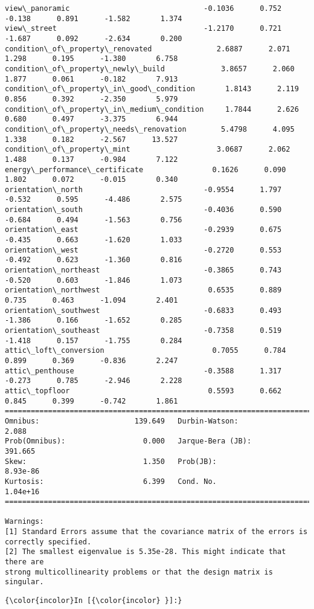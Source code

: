 \documentclass[11pt]{article}
\begin{document}
\begin{Verbatim}[commandchars=\\\{\}]
view\_panoramic                               -0.1036      0.752     -0.138      0.891      -1.582       1.374
view\_street                                  -1.2170      0.721     -1.687      0.092      -2.634       0.200
condition\_of\_property\_renovated               2.6887      2.071      1.298      0.195      -1.380       6.758
condition\_of\_property\_newly\_build             3.8657      2.060      1.877      0.061      -0.182       7.913
condition\_of\_property\_in\_good\_condition       1.8143      2.119      0.856      0.392      -2.350       5.979
condition\_of\_property\_in\_medium\_condition     1.7844      2.626      0.680      0.497      -3.375       6.944
condition\_of\_property\_needs\_renovation        5.4798      4.095      1.338      0.182      -2.567      13.527
condition\_of\_property\_mint                    3.0687      2.062      1.488      0.137      -0.984       7.122
energy\_performance\_certificate                0.1626      0.090      1.802      0.072      -0.015       0.340
orientation\_north                            -0.9554      1.797     -0.532      0.595      -4.486       2.575
orientation\_south                            -0.4036      0.590     -0.684      0.494      -1.563       0.756
orientation\_east                             -0.2939      0.675     -0.435      0.663      -1.620       1.033
orientation\_west                             -0.2720      0.553     -0.492      0.623      -1.360       0.816
orientation\_northeast                        -0.3865      0.743     -0.520      0.603      -1.846       1.073
orientation\_northwest                         0.6535      0.889      0.735      0.463      -1.094       2.401
orientation\_southwest                        -0.6833      0.493     -1.386      0.166      -1.652       0.285
orientation\_southeast                        -0.7358      0.519     -1.418      0.157      -1.755       0.284
attic\_loft\_conversion                         0.7055      0.784      0.899      0.369      -0.836       2.247
attic\_penthouse                              -0.3588      1.317     -0.273      0.785      -2.946       2.228
attic\_topfloor                                0.5593      0.662      0.845      0.399      -0.742       1.861
==============================================================================
Omnibus:                      139.649   Durbin-Watson:                   2.088
Prob(Omnibus):                  0.000   Jarque-Bera (JB):              391.665
Skew:                           1.350   Prob(JB):                     8.93e-86
Kurtosis:                       6.399   Cond. No.                     1.04e+16
==============================================================================

Warnings:
[1] Standard Errors assume that the covariance matrix of the errors is correctly specified.
[2] The smallest eigenvalue is 5.35e-28. This might indicate that there are
strong multicollinearity problems or that the design matrix is singular.

    \end{Verbatim}

    \begin{Verbatim}[commandchars=\\\{\}]
{\color{incolor}In [{\color{incolor} }]:} 
\end{Verbatim}


    
    
    
    
\end{document}
